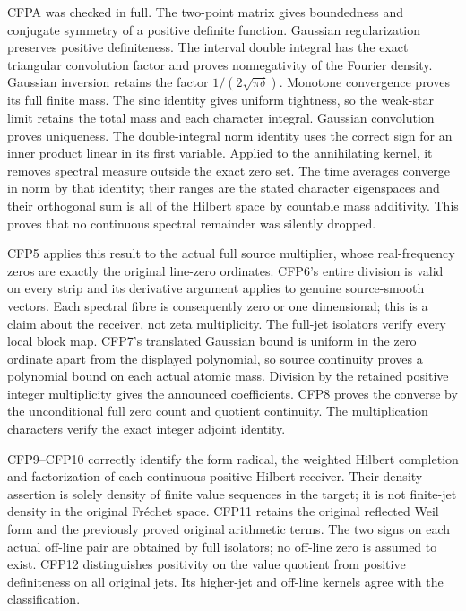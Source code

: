 CFPA was checked in full. The two-point matrix gives boundedness and
conjugate symmetry of a positive definite function. Gaussian
regularization preserves positive definiteness. The interval double
integral has the exact triangular convolution factor and proves
nonnegativity of the Fourier density. Gaussian inversion retains the
factor \(1/(2\sqrt{\pi\delta})\). Monotone convergence proves its full
finite mass. The sinc identity gives uniform tightness, so the weak-star
limit retains the total mass and each character integral. Gaussian
convolution proves uniqueness. The double-integral norm identity uses
the correct sign for an inner product linear in its first variable.
Applied to the annihilating kernel, it removes spectral measure outside
the exact zero set. The time averages converge in norm by that identity;
their ranges are the stated character eigenspaces and their orthogonal
sum is all of the Hilbert space by countable mass additivity. This
proves that no continuous spectral remainder was silently dropped.

CFP5 applies this result to the actual full source multiplier, whose
real-frequency zeros are exactly the original line-zero ordinates.
CFP6's entire division is valid on every strip and its derivative
argument applies to genuine source-smooth vectors. Each spectral fibre
is consequently zero or one dimensional; this is a claim about the
receiver, not zeta multiplicity. The full-jet isolators verify every
local block map. CFP7's translated Gaussian bound is uniform in the zero
ordinate apart from the displayed polynomial, so source continuity
proves a polynomial bound on each actual atomic mass. Division by the
retained positive integer multiplicity gives the announced coefficients.
CFP8 proves the converse by the unconditional full zero count and
quotient continuity. The multiplication characters verify the exact
integer adjoint identity.

CFP9--CFP10 correctly identify the form radical, the weighted Hilbert
completion and factorization of each continuous positive Hilbert
receiver. Their density assertion is solely density of finite value
sequences in the target; it is not finite-jet density in the original
Fréchet space. CFP11 retains the original reflected Weil form and the
previously proved original arithmetic terms. The two signs on each
actual off-line pair are obtained by full isolators; no off-line zero is
assumed to exist. CFP12 distinguishes positivity on the value quotient
from positive definiteness on all original jets. Its higher-jet and
off-line kernels agree with the classification.

